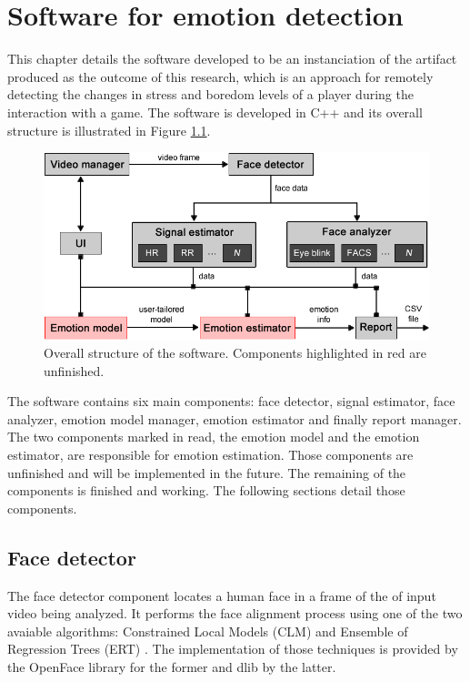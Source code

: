 \chapter{Software for emotion detection}
\label{ch:software}

This chapter details the software developed to be an instanciation of the artifact produced as the outcome of this research, which is an approach for remotely detecting the changes in stress and boredom levels of a player during the interaction with a game. The software is developed in C++ and its overall structure is illustrated in Figure \ref{fig:tool-overall-structure}.

\begin{figure}[h]
    \centering
    \includegraphics[width=\textwidth]{figures/tool-overall-structure.png}
    \caption{Overall structure of the software. Components highlighted in red are unfinished.}
    \label{fig:tool-overall-structure}
\end{figure}

The software contains six main components: face detector, signal estimator, face analyzer, emotion model manager, emotion estimator and finally report manager. The two components marked in read, the emotion model and the emotion estimator, are responsible for emotion estimation. Those components are unfinished and will be implemented in the future. The remaining of the components is finished and working. The following sections detail those components.

\section{Face detector}

The face detector component locates a human face in a frame of the of input video being analyzed. It performs the face alignment process using one of the two avaiable algorithms: Constrained Local Models (CLM) \parencite{cristinacce2006feature} and Ensemble of Regression Trees (ERT) \parencite{kazemi2014one}. The implementation of those techniques is provided by the OpenFace library \parencite{openface} for the former and dlib \parencite{dlib} by the latter.

